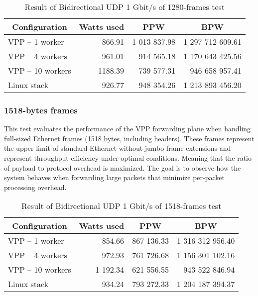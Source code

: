 \begin{table}[h!]
\centering
\begin{tabular}{|l|r|r|r|}
\hline
\multicolumn{1}{|c|}{\textbf{Configuration}} &
\multicolumn{1}{c|}{\textbf{Watts used}} &
\multicolumn{1}{c|}{\textbf{PPW}} &
\multicolumn{1}{c|}{\textbf{BPW}} \\
\hline
VPP -- 1 worker & 866.91 & 1 013 837.98 & 1 297 712 609.61 \\
VPP -- 4 workers & 961.01 & 914 565.18 & 1 170 643 425.56 \\
VPP -- 10 workers & 1188.39 & 739 577.31 & 946 658 957.41 \\
Linux stack & 926.77 & 948 354.26 & 1 213 893 456.20 \\
\hline
\end{tabular}
\caption{Result of Bidirectional UDP 1 Gbit/s of 1280-frames test}
\label{tab:udp:four}
\end{table}



\subsubsection{1518-bytes frames}
This test evaluates the performance of the VPP forwarding plane when handling full-sized Ethernet frames (1518 bytes, including headers). 
These frames represent the upper limit of standard Ethernet without jumbo frame extensions and represent throughput efficiency under optimal conditions. 
Meaning that the ratio of payload to protocol overhead is maximized. The goal is to observe how the system behaves when forwarding large packets that minimize per-packet processing overhead.

\begin{table}[h!]
\centering
\begin{tabular}{|l|r|r|r|}
\hline
\multicolumn{1}{|c|}{\textbf{Configuration}} &
\multicolumn{1}{c|}{\textbf{Watts used}} &
\multicolumn{1}{c|}{\textbf{PPW}} &
\multicolumn{1}{c|}{\textbf{BPW}} \\
\hline
VPP -- 1 worker & 854.66 & 867 136.33 & 1 316 312 956.40 \\
VPP -- 4 workers & 972.93 & 761 726.68 & 1 156 301 102.16 \\
VPP -- 10 workers & 1 192.34 & 621 556.55 & 943 522 846.94 \\
Linux stack & 934.24 & 793 272.33 & 1 204 187 394.37 \\
\hline
\end{tabular}
\caption{Result of Bidirectional UDP 1 Gbit/s of 1518-frames test}
\label{tab:udp:five}
\end{table}

